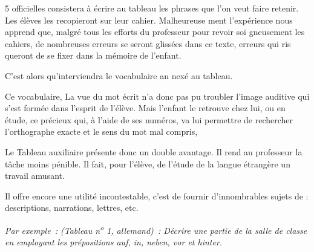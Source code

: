 \begin{VUpage}[7]{5}
\VUcontinue
officielles consistera à écrire au tableau les\nl
phrases que l'on veut faire retenir. Les élèves\nl
les recopieront sur leur cahier. Malheureuse\cc
ment l'expérience nous apprend que, malgré\nl
tous les efforts du professeur pour revoir soi\cc
gneusement les cahiers, de nombreuses erreurs\nl
se seront glissées dans ce texte, erreurs qui ris\cc
queront de se fixer dans la mémoire de l'enfant.

\VUblancAlinea
C'est alors qu'interviendra le vocabulaire an\cc
nexé au tableau.

\VUblancAlinea
Ce vocabulaire, \nl
{}\nl
La vue du mot écrit n'a donc pas pu troubler\nl
l'image auditive qui s'est formée dans l'esprit\nl
de l'élève. Mais l'enfant le retrouve chez lui, ou\nl
en étude, ce précieux  qui, à l'aide\nl
de ses numéros, va lui permettre de rechercher\nl
l'orthographe exacte et le sens du mot mal\nl
compris, \nl
{}

\VUblancAlinea
Le Tableau auxiliaire présente donc un double\nl
avantage. Il rend au professeur la tâche moins\nl
pénible. Il fait, pour l'élève, de l'étude de la\nl
langue étrangère un travail amusant.

\VUblancAlinea
Il offre encore une utilité incontestable, c'est\nl
de fournir d'innombrables sujets de \nl
{} : descriptions, narrations, lettres, etc.

\VUblancAlinea
{\itshape Par exemple~: (Tableau n\textsuperscript{o} 1, allemand)~:\nl
Décrire une partie de la salle de classe en\nl
employant les prépositions auf, in, neben,\nl
vor et hinter.\par}
\end{VUpage}

